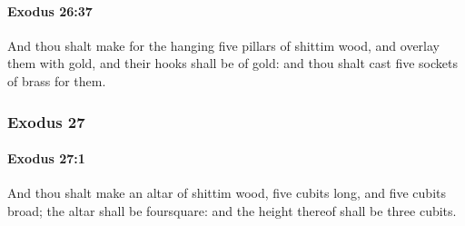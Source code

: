 		\paragraph{Exodus 26:37} %
			\label{EXODUS-26-37}

			And thou shalt make for the hanging five pillars of shittim wood, and overlay them with gold, and their hooks shall be of gold: and thou shalt cast five sockets of brass for them.

	\subsubsection{Exodus 27} %
		\label{EXODUS-27}

		\paragraph{Exodus 27:1} %
			\label{EXODUS-27-1}

			And thou shalt make an altar of shittim wood, five cubits long, and five cubits broad; the altar shall be foursquare: and the height thereof shall be three cubits.


